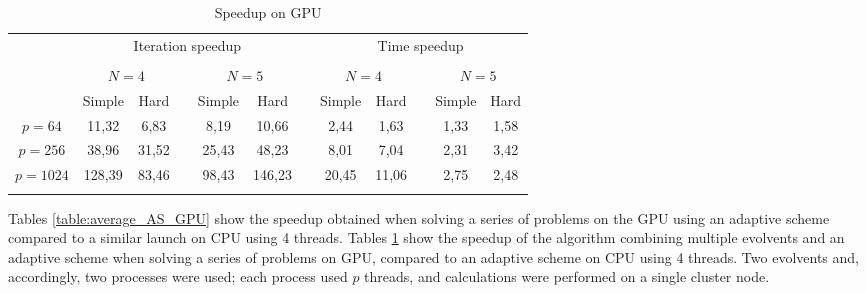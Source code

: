 \documentclass{svproc}
\begin{document}
\begin{table}
                \caption{Speedup on GPU}
                \label{table:average_MMAS_GPU}
                \center
                \begin{tabular}{cccccccccccc}
                & \multicolumn{5}{c}{ Iteration speedup} & & \multicolumn{5}{c}{ Time speedup}\\
                               \noalign{\smallskip} \cline{2-6} \cline{8-12}  \\
                               & \multicolumn{2}{c}{ $N=4$ } & & \multicolumn{2}{c}{$N=5$} &  & \multicolumn{2}{c}{ $N=4$ } & & \multicolumn{2}{c}{$N=5$} \\
                               \noalign{\smallskip} \cline{2-3} \cline{5-6}  \cline{8-9} \cline{11-12} \noalign{\smallskip}
                               & Simple & Hard & & Simple & Hard &  & Simple & Hard & & Simple & Hard  \\
                               \noalign{\smallskip} \hline \noalign{\smallskip}                               
                               $p=64$  &    11,32	 & 6,83	 &   & 8,19	     & 10,66  &   & 2,44	 & 1,63	 &   & 1,33	 & 1,58 \\
                               $p=256$ &    38,96	 & 31,52 &   & 25,43	 & 48,23  &   & 8,01	 & 7,04	 &   & 2,31	 & 3,42 \\
							   $p=1024$&    128,39	 & 83,46 &   & 98,43	 & 146,23 &   & 20,45	 & 11,06 &   & 2,75	 & 2,48 \\
                               \noalign{\smallskip}\hline
                \end{tabular}
\end{table}





Tables \ref{table:average_AS_GPU} show the speedup obtained when solving a series of problems on the GPU using an adaptive scheme compared to a similar launch on CPU using 4 threads. Tables \ref{table:average_MMAS_GPU} show the speedup of the algorithm combining multiple evolvents and an adaptive scheme when solving a series of problems on GPU, compared to an adaptive scheme on CPU using 4 threads. Two evolvents and, accordingly, two processes were used; each process used $p$ threads, and calculations were performed on a single cluster node.
\end{document}
